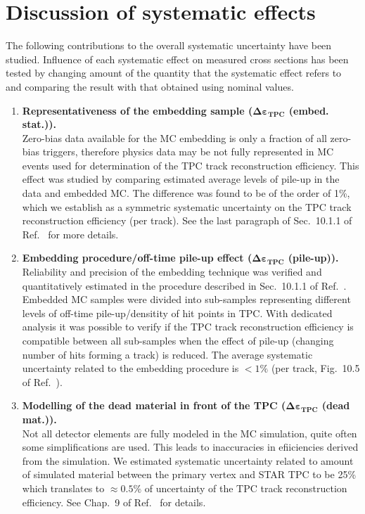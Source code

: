 
\section{Discussion of systematic effects}\label{sec:systEffectsList}
The following contributions to the overall systematic uncertainty have been studied. Influence of each systematic effect on measured cross sections has been tested by changing amount of the quantity that the systematic effect refers to and comparing the result with that obtained using nominal values.

\begin{enumerate}
 \item \textbf{Representativeness of the embedding sample ($\bm{\Delta\varepsilon_{\text{TPC}}}$ (embed. stat.)).}\\
 Zero-bias data available for the MC embedding is only a fraction of all zero-bias triggers, therefore physics data may be not fully represented in MC events used for determination of the TPC track reconstruction efficiency. This effect was studied by comparing estimated average levels of pile-up in the data and embedded MC. The difference was found to be of the order of 1\%, which we establish as a symmetric systematic uncertainty on the TPC track reconstruction efficiency (per track). See the last paragraph of Sec.~10.1.1 of Ref.~\cite{supplementaryNote} for more details.
 \item \textbf{Embedding procedure/off-time pile-up effect ($\bm{\Delta\varepsilon_{\text{TPC}}}$ (pile-up)).}\\
 Reliability and precision of the embedding technique was verified and quantitatively estimated in the procedure described in Sec.~10.1.1 of Ref.~\cite{supplementaryNote}. Embedded MC samples were divided into sub-samples representing different levels of off-time pile-up/densitity of hit points in TPC. With dedicated analysis it was possible to verify if the TPC track reconstruction efficiency is compatible between all sub-samples when the effect of pile-up (changing number of hits forming a track) is reduced. The average systematic uncertainty related to the embedding procedure is $<1\%$ (per track, Fig.~10.5 of Ref.~\cite{supplementaryNote}).
 \item \textbf{Modelling of the dead material in front of the TPC ($\bm{\Delta\varepsilon_{\text{TPC}}}$ (dead mat.)).}\\
 Not all detector elements are fully modeled in the MC simulation, quite often some simplifications are used. This leads to inaccuracies in efiiciencies derived from the simulation. We estimated systematic uncertainty related to amount of simulated material between the primary vertex and STAR TPC to be 25\% which translates to $\approx 0.5\%$ of uncertainty of the TPC track reconstruction efficiency. See Chap.~9 of Ref.~\cite{supplementaryNote} for details.

\end{enumerate}
